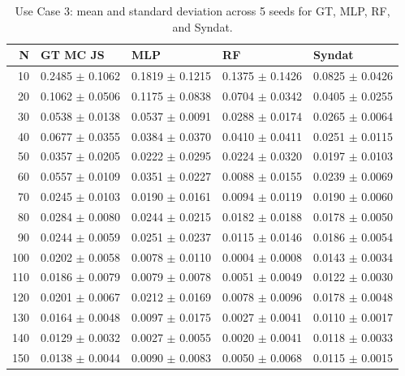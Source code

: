 \begin{table}
\caption{Use Case 3: mean and standard deviation across 5 seeds for GT, MLP, RF, and Syndat.}
\label{tab:uc3_mean_std_from_ci}
\begin{tabular}{rllll}
\toprule
N & GT MC JS & MLP & RF & Syndat \\
\midrule
10 & 0.2485 $\pm$ 0.1062 & 0.1819 $\pm$ 0.1215 & 0.1375 $\pm$ 0.1426 & 0.0825 $\pm$ 0.0426 \\
20 & 0.1062 $\pm$ 0.0506 & 0.1175 $\pm$ 0.0838 & 0.0704 $\pm$ 0.0342 & 0.0405 $\pm$ 0.0255 \\
30 & 0.0538 $\pm$ 0.0138 & 0.0537 $\pm$ 0.0091 & 0.0288 $\pm$ 0.0174 & 0.0265 $\pm$ 0.0064 \\
40 & 0.0677 $\pm$ 0.0355 & 0.0384 $\pm$ 0.0370 & 0.0410 $\pm$ 0.0411 & 0.0251 $\pm$ 0.0115 \\
50 & 0.0357 $\pm$ 0.0205 & 0.0222 $\pm$ 0.0295 & 0.0224 $\pm$ 0.0320 & 0.0197 $\pm$ 0.0103 \\
60 & 0.0557 $\pm$ 0.0109 & 0.0351 $\pm$ 0.0227 & 0.0088 $\pm$ 0.0155 & 0.0239 $\pm$ 0.0069 \\
70 & 0.0245 $\pm$ 0.0103 & 0.0190 $\pm$ 0.0161 & 0.0094 $\pm$ 0.0119 & 0.0190 $\pm$ 0.0060 \\
80 & 0.0284 $\pm$ 0.0080 & 0.0244 $\pm$ 0.0215 & 0.0182 $\pm$ 0.0188 & 0.0178 $\pm$ 0.0050 \\
90 & 0.0244 $\pm$ 0.0059 & 0.0251 $\pm$ 0.0237 & 0.0115 $\pm$ 0.0146 & 0.0186 $\pm$ 0.0054 \\
100 & 0.0202 $\pm$ 0.0058 & 0.0078 $\pm$ 0.0110 & 0.0004 $\pm$ 0.0008 & 0.0143 $\pm$ 0.0034 \\
110 & 0.0186 $\pm$ 0.0079 & 0.0079 $\pm$ 0.0078 & 0.0051 $\pm$ 0.0049 & 0.0122 $\pm$ 0.0030 \\
120 & 0.0201 $\pm$ 0.0067 & 0.0212 $\pm$ 0.0169 & 0.0078 $\pm$ 0.0096 & 0.0178 $\pm$ 0.0048 \\
130 & 0.0164 $\pm$ 0.0048 & 0.0097 $\pm$ 0.0175 & 0.0027 $\pm$ 0.0041 & 0.0110 $\pm$ 0.0017 \\
140 & 0.0129 $\pm$ 0.0032 & 0.0027 $\pm$ 0.0055 & 0.0020 $\pm$ 0.0041 & 0.0118 $\pm$ 0.0033 \\
150 & 0.0138 $\pm$ 0.0044 & 0.0090 $\pm$ 0.0083 & 0.0050 $\pm$ 0.0068 & 0.0115 $\pm$ 0.0015 \\
\bottomrule
\end{tabular}
\end{table}
